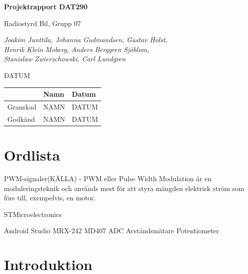 \documentclass[a4paper]{article}
\begin{document}
\begin{titlepage}
\centering
{\bfseries\huge Projektrapport DAT290}

\vspace{10mm}

{\Large Radiostyrd Bil, Grupp 07}

\vspace{20mm}

{\Large \itshape{Joakim Junttila, Johanna Gudmandsen, Gustav Holst,\\Henrik Klein Moberg, Anders Berggren Sjöblom, \\[1mm] Stanislaw Zwierzchowski, Carl Lundgren}}

\vspace{10mm}

{DATUM}


\normalsize{
\begin{table}[b]
\centering
\begin{tabular}{|l|l|l|}  \hline
         & \bf Namn & \bf Datum   \\ \hline \hline
Granskad & NAMN     & DATUM        \\ \hline
Godkänd  & NAMN     & DATUM         \\ \hline
 \end{tabular} 
 \end{table}}
\end{titlepage}

\tableofcontents

\newpage
\section{Ordlista}
PWM-signaler(KÄLLA) - PWM eller Pulse Width Modulation är en moduleringsteknik och används mest för att styra mängden elektrisk ström som förs till, exempelvis, en motor.

STMicroelectronics

Android Studio
MRX-242
MD407
ADC
Avståndsmätare
Potentiometer


\newpage
\section{Introduktion}
\end{document}
